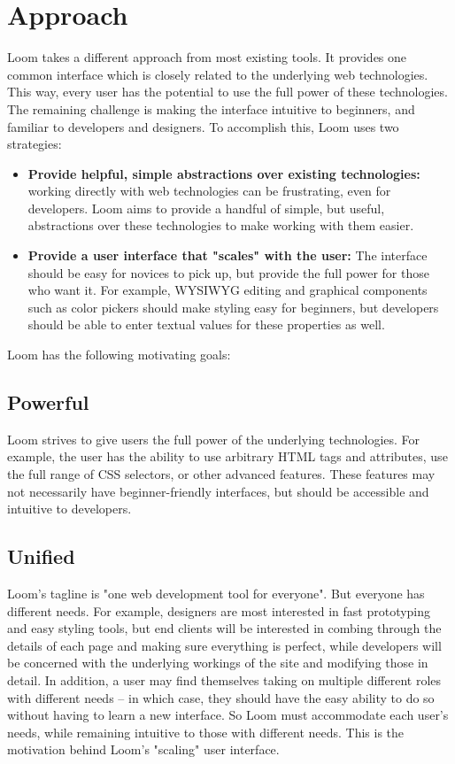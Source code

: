 \documentclass[conference, letterpaper]{IEEEtran}
\begin{document}
\section{Approach}
Loom takes a different approach from most existing tools. It provides one common interface which is closely related to the underlying web technologies. This way, every user has the potential to use the full power of these technologies. The remaining challenge is making the interface intuitive to beginners, and familiar to developers and designers. To accomplish this, Loom uses two strategies:
\begin{itemize}
    \item \textbf{Provide helpful, simple abstractions over existing technologies:} working directly with web technologies can be frustrating, even for developers. Loom aims to provide a handful of simple, but useful, abstractions over these technologies to make working with them easier.
    \item \textbf{Provide a user interface that "scales" with the user:} The interface should be easy for novices to pick up, but provide the full power for those who want it. For example, WYSIWYG editing and graphical components such as color pickers should make styling easy for beginners, but developers should be able to enter textual values for these properties as well.
\end{itemize}

Loom has the following motivating goals:

\subsection{Powerful}
Loom strives to give users the full power of the underlying technologies. For example, the user has the ability to use arbitrary HTML tags and attributes, use the full range of CSS selectors, or other advanced features. These features may not necessarily have beginner-friendly interfaces, but should be accessible and intuitive to developers.

\subsection{Unified}
Loom's tagline is "one web development tool for everyone". But everyone has different needs. For example, designers are most interested in fast prototyping and easy styling tools, but end clients will be interested in combing through the details of each page and making sure everything is perfect, while developers will be concerned with the underlying workings of the site and modifying those in detail. In addition, a user may find themselves taking on multiple different roles with different needs -- in which case, they should have the easy ability to do so without having to learn a new interface. So Loom must accommodate each user's needs, while remaining intuitive to those with different needs. This is the motivation behind Loom's "scaling" user interface.
\end{document}
